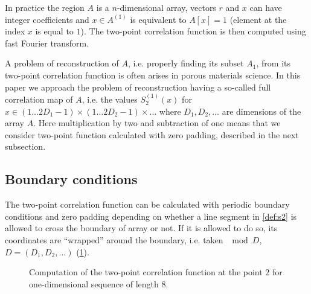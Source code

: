 \documentclass[12pt, a4paper]{article}
\begin{document}
In practice the region $A$ is a $n$-dimensional array, vectors $r$ and $x$ can
have integer coefficients and $x \in A^{(1)}$ is equivalent to $A[x] = 1$
(element at the index $x$ is equal to $1$). The two-point correlation function
is then computed using fast Fourier transform.

A problem of reconstruction of $A$, i.e. properly finding its subset $A_1$, from
its two-point correlation function is often arises in porous materials
science. In this paper we approach the problem of reconstruction having a
so-called full correlation map of $A$, i.e. the values $S_2^{(1)}(x)$ for
$x \in (1 \dots 2D_1-1)\times(1 \dots 2D_2-1)\times\dots$ where
$D_1, D_2, \dots$ are dimensions of the array $A$. Here multiplication by two
and subtraction of one means that we consider two-point function calculated with
zero padding, described in the next subsection.

\subsection{Boundary conditions}
The two-point correlation function can be calculated with periodic boundary
conditions and zero padding depending on whether a line segment in
\cref{def:s2} is allowed to cross the boundary of array or not. If it is allowed
to do so, its coordinates are ``wrapped'' around the boundary, i.e. taken
$\mod D$, $D = (D_1, D_2, \dots)$ (\cref{fig:s2-computation}).
\begin{figure}[tp]
  \centering
  \hfill
  \caption[]{Computation of the two-point correlation function at the point $2$
    for one-dimensional sequence of length 8.}
  \label{fig:s2-computation}
\end{figure}
\end{document}
